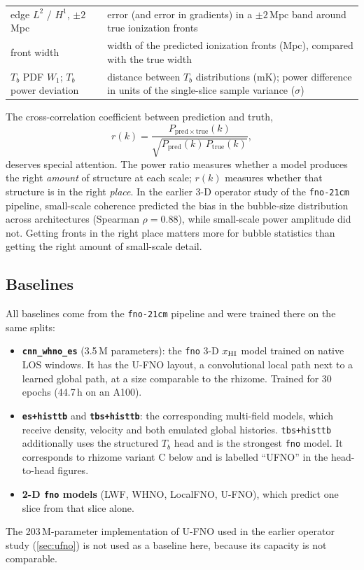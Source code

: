 \begin{table}[!tp]
\begin{tabular}{@{}p{4.3cm}p{9.6cm}@{}}
    edge $L^2$ / $H^1$, $\pm2$\,Mpc & error (and error in gradients) in a $\pm2$\,Mpc band around true ionization fronts \\
    front width & width of the predicted ionization fronts (Mpc), compared with the true width \\
    $T_b$ PDF $W_1$; $T_b$ power deviation & distance between $T_b$ distributions (mK); power difference in units of the single-slice sample variance ($\sigma$) \\
    \bottomrule
  \end{tabular}
\end{table}

The cross-correlation coefficient between prediction and truth,
\begin{equation}
  \label{eq:cross-correlation}
  r(k) = \frac{P_{\mathrm{pred}\times\mathrm{true}}(k)}
              {\sqrt{P_{\mathrm{pred}}(k)\,P_{\mathrm{true}}(k)}},
\end{equation}
deserves special attention. The power ratio measures whether a model produces the right \emph{amount} of structure at each scale; $r(k)$ measures whether that structure is in the right \emph{place}. In the earlier 3-D operator study of the \texttt{fno-21cm} pipeline, small-scale coherence predicted the bias in the bubble-size distribution across architectures (Spearman $\rho=0.88$), while small-scale power amplitude did not. Getting fronts in the right place matters more for bubble statistics than getting the right amount of small-scale detail.

\subsection{Baselines}
\label{sec:baselines}

All baselines come from the \texttt{fno-21cm} pipeline and were trained there on the same splits:
\begin{itemize}
  \item \textbf{\texttt{cnn\_whno\_es}} (3.5\,M parameters): the \texttt{fno} 3-D $x_{\mathrm{HI}}$ model trained on native LOS windows. It has the U-FNO layout, a convolutional local path next to a learned global path, at a size comparable to the rhizome. Trained for 30 epochs (44.7\,h on an A100).
  \item \textbf{\texttt{es+histtb}} and \textbf{\texttt{tbs+histtb}}: the corresponding multi-field models, which receive density, velocity and both emulated global histories. \texttt{tbs+histtb} additionally uses the structured $T_b$ head and is the strongest \texttt{fno} model. It corresponds to rhizome variant C below and is labelled ``UFNO'' in the head-to-head figures.
  \item \textbf{2-D \texttt{fno} models} (LWF, WHNO, LocalFNO, U-FNO), which predict one slice from that slice alone.
\end{itemize}
The 203\,M-parameter implementation of U-FNO \citep{wen2022ufno} used in the earlier operator study (\cref{sec:ufno}) is not used as a baseline here, because its capacity is not comparable.

